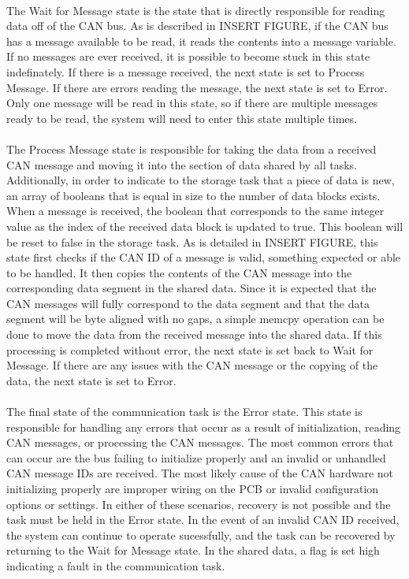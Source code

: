 \paragraph{}
The Wait for Message state is the state that is directly responsible for reading data off of the CAN bus.
As is described in INSERT FIGURE, if the CAN bus has a message available to be read, it reads the contents into a message variable.
If no messages are ever received, it is possible to become stuck in this state indefinately.
If there is a message received, the next state is set to Process Message.
If there are errors reading the message, the next state is set to Error.
Only one message will be read in this state, so if there are multiple messages ready to be read, the system will need to enter this state multiple times.

\paragraph{}
The Process Message state is responsible for taking the data from a received CAN message and moving it into the section of data shared by all tasks.
Additionally, in order to indicate to the storage task that a piece of data is new, an array of booleans that is equal in size to the number of data blocks exists.
When a message is received, the boolean that corresponds to the same integer value as the index of the received data block is updated to true.
This boolean will be reset to false in the storage task.
As is detailed in INSERT FIGURE, this state first checks if the CAN ID of a message is valid, something expected or able to be handled.
It then copies the contents of the CAN message into the corresponding data segment in the shared data.
Since it is expected that the CAN messages will fully correspond to the data segment and that the data segment will be byte aligned with no gaps, a simple memcpy operation can be done to move the data from the received message into the shared data.
If this processing is completed without error, the next state is set back to Wait for Message.
If there are any issues with the CAN message or the copying of the data, the next state is set to Error.

\paragraph{}
The final state of the communication task is the Error state.
This state is responsible for handling any errors that occur as a result of initialization, reading CAN messages, or processing the CAN messages.
The most common errors that can occur are the bus failing to initialize properly and an invalid or unhandled CAN message IDs are received.
The most likely cause of the CAN hardware not initializing properly are improper wiring on the PCB or invalid configuration options or settings.
In either of these scenarios, recovery is not possible and the task must be held in the Error state.
In the event of an invalid CAN ID received, the system can continue to operate sucessfully, and the task can be recovered by returning to the Wait for Message state.
In the shared data, a flag is set high indicating a fault in the communication task.

